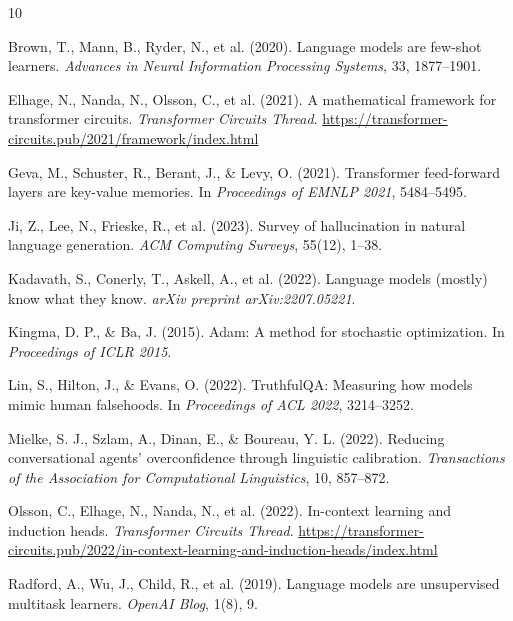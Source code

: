 \documentclass[11pt,a4paper]{article}
\begin{document}
\begin{thebibliography}{10}

Brown, T., Mann, B., Ryder, N., et al. (2020).
Language models are few-shot learners.
\emph{Advances in Neural Information Processing Systems}, 33,
1877--1901.

Elhage, N., Nanda, N., Olsson, C., et al. (2021).
A mathematical framework for transformer circuits.
\emph{Transformer Circuits Thread}.
\url{https://transformer-circuits.pub/2021/framework/index.html}

Geva, M., Schuster, R., Berant, J., \& Levy, O. (2021).
Transformer feed-forward layers are key-value memories.
In \emph{Proceedings of EMNLP 2021}, 5484--5495.

Ji, Z., Lee, N., Frieske, R., et al. (2023).
Survey of hallucination in natural language generation.
\emph{ACM Computing Surveys}, 55(12), 1--38.

Kadavath, S., Conerly, T., Askell, A., et al. (2022).
Language models (mostly) know what they know.
\emph{arXiv preprint arXiv:2207.05221}.

Kingma, D. P., \& Ba, J. (2015).
Adam: A method for stochastic optimization.
In \emph{Proceedings of ICLR 2015}.

Lin, S., Hilton, J., \& Evans, O. (2022).
TruthfulQA: Measuring how models mimic human falsehoods.
In \emph{Proceedings of ACL 2022}, 3214--3252.

Mielke, S. J., Szlam, A., Dinan, E., \& Boureau, Y. L. (2022).
Reducing conversational agents' overconfidence through
linguistic calibration.
\emph{Transactions of the Association for Computational
Linguistics}, 10, 857--872.

Olsson, C., Elhage, N., Nanda, N., et al. (2022).
In-context learning and induction heads.
\emph{Transformer Circuits Thread}.
\url{https://transformer-circuits.pub/2022/in-context-learning-and-induction-heads/index.html}

Radford, A., Wu, J., Child, R., et al. (2019).
Language models are unsupervised multitask learners.
\emph{OpenAI Blog}, 1(8), 9.

\end{thebibliography}
\end{document}
